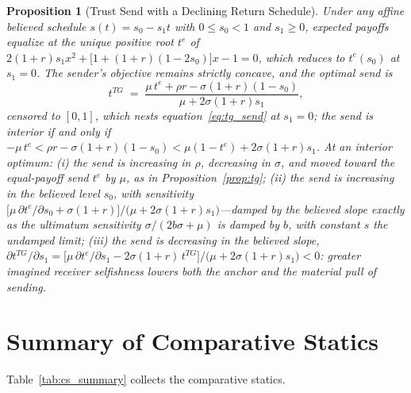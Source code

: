 \documentclass[11pt]{article}
\theoremstyle{plain}
\newtheorem{proposition}{Proposition}
\theoremstyle{remark}
\begin{document}
\begin{proposition}[Trust Send with a Declining Return Schedule]
\label{prop:tg_endog}
Under any affine believed schedule $s(t)=s_{0}-s_{1}t$ with $0\le s_{0}<1$ and $s_{1}\ge 0$, expected payoffs equalize at the unique positive root $t^{e}$ of $2(1+r)s_{1}x^{2}+\bigl[1+(1+r)(1-2s_{0})\bigr]x-1=0$, which reduces to $t^{e}(s_{0})$ at $s_{1}=0$. The sender's objective remains strictly concave, and the optimal send is
\begin{equation}
t^{TG}\;=\;\frac{\mu\,t^{e}+\rho r-\sigma(1+r)(1-s_{0})}{\mu+2\sigma(1+r)s_{1}},
\label{eq:tg_send_endog}
\end{equation}
censored to $[0,1]$, which nests equation~\eqref{eq:tg_send} at $s_{1}=0$; the send is interior if and only if $-\mu\,t^{e}<\rho r-\sigma(1+r)(1-s_{0})<\mu(1-t^{e})+2\sigma(1+r)s_{1}$. At an interior optimum: (i) the send is increasing in $\rho$, decreasing in $\sigma$, and moved toward the equal-payoff send $t^{e}$ by $\mu$, as in Proposition~\ref{prop:tg}; (ii) the send is increasing in the believed level $s_{0}$, with sensitivity $\bigl[\mu\,\partial t^{e}/\partial s_{0}+\sigma(1+r)\bigr]/\bigl(\mu+2\sigma(1+r)s_{1}\bigr)$---damped by the believed slope exactly as the ultimatum sensitivity $\sigma/(2b\sigma+\mu)$ is damped by $b$, with constant $s$ the undamped limit; (iii) the send is decreasing in the believed slope, $\partial t^{TG}/\partial s_{1}=\bigl[\mu\,\partial t^{e}/\partial s_{1}-2\sigma(1+r)\,t^{TG}\bigr]/\bigl(\mu+2\sigma(1+r)s_{1}\bigr)<0$: greater imagined receiver selfishness lowers both the anchor and the material pull of sending.
\end{proposition}

\section{Summary of Comparative Statics}
Table~\ref{tab:cs_summary} collects the comparative statics.
\end{document}
